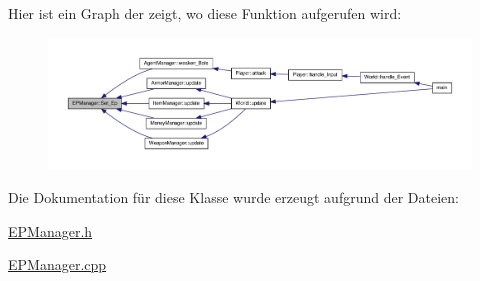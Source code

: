 Hier ist ein Graph der zeigt, wo diese Funktion aufgerufen wird\-:
\nopagebreak
\begin{figure}[H]
\begin{center}
\leavevmode
\includegraphics[width=350pt]{class_e_p_manager_a300554dc6cd44d47ece8ebe6d8ed2daa_icgraph}
\end{center}
\end{figure}




Die Dokumentation für diese Klasse wurde erzeugt aufgrund der Dateien\-:\begin{DoxyCompactItemize}
\item 
\hyperlink{_e_p_manager_8h}{E\-P\-Manager.\-h}\item 
\hyperlink{_e_p_manager_8cpp}{E\-P\-Manager.\-cpp}\end{DoxyCompactItemize}
